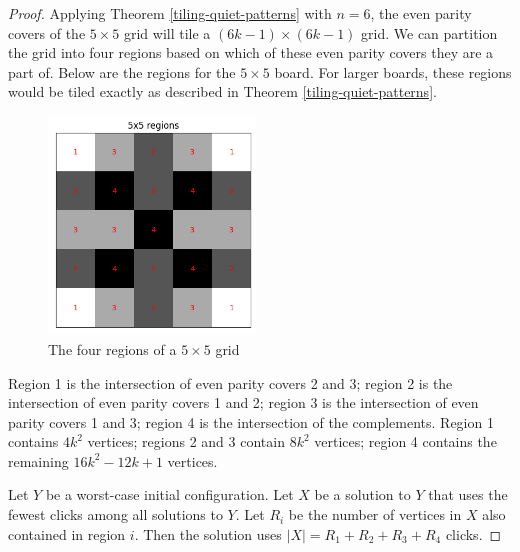 \documentclass[a4paper]{article}
\newcommand{\abs}[1]{\left| #1 \right|}
\begin{document}
	\begin{proof}
		Applying Theorem \ref{tiling-quiet-patterns} with $n=6$, the even parity covers of the $5 \times 5$ grid will tile a $(6k - 1) \times (6k - 1)$ grid.
		We can partition the grid into four regions based on which of these even parity covers they are a part of.
		Below are the regions for the $5 \times 5$ board.
		For larger boards, these regions would be tiled exactly as described in Theorem \ref{tiling-quiet-patterns}.
		
		\begin{figure}[H]
			\centering
			\includegraphics[width=0.49\textwidth]{../../code/serialization/regions/5x5_regions.png}
			\caption{The four regions of a $5 \times 5$ grid}
		\end{figure}
		
		Region 1 is the intersection of even parity covers 2 and 3;
		region 2 is the intersection of even parity covers 1 and 2;
		region 3 is the intersection of even parity covers 1 and 3;
		region 4 is the intersection of the complements.
		Region 1 contains $4k^2$ vertices;
		regions 2 and 3 contain $8k^2$ vertices;
		region 4 contains the remaining $16k^2 - 12k + 1$ vertices.
		
		Let $Y$ be a worst-case initial configuration.
		Let $X$ be a solution to $Y$ that uses the fewest clicks among all solutions to $Y$.
		Let $R_i$ be the number of vertices in $X$ also contained in region $i$.
		Then the solution uses $\abs{X} = R_1 + R_2 + R_3 + R_4$ clicks.
		

\end{proof}
\end{document}
